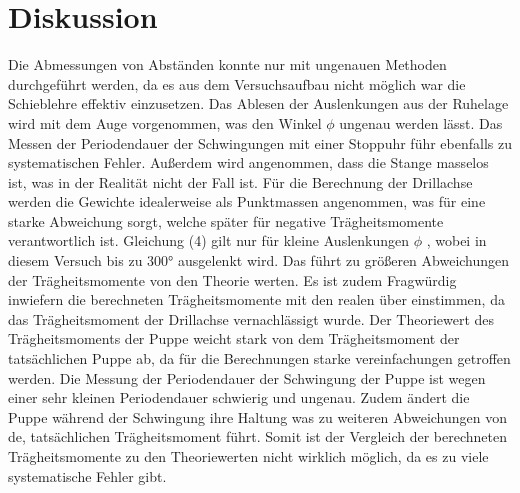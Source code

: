 \section{Diskussion}
\label{sec:Diskussion}
Die Abmessungen von Abständen konnte nur mit ungenauen Methoden durchgeführt werden,
da es aus dem Versuchsaufbau nicht möglich war die Schieblehre effektiv einzusetzen.
Das Ablesen der Auslenkungen aus der Ruhelage wird mit dem Auge vorgenommen, was
den Winkel $\phi$ ungenau werden lässt. Das Messen der Periodendauer der
Schwingungen mit einer Stoppuhr führ ebenfalls zu systematischen Fehler.
Außerdem wird angenommen, dass die Stange masselos ist, was in der Realität
nicht der Fall ist. Für die Berechnung der Drillachse werden die Gewichte idealerweise
als Punktmassen angenommen, was für eine starke Abweichung sorgt, welche später für
negative Trägheitsmomente verantwortlich ist.
Gleichung (4) gilt nur für kleine Auslenkungen $\phi$ , wobei
in diesem Versuch bis zu 300° ausgelenkt wird. Das führt zu größeren Abweichungen
der Trägheitsmomente von den Theorie werten. Es ist zudem Fragwürdig inwiefern die
berechneten Trägheitsmomente mit den realen über einstimmen, da das Trägheitsmoment
der Drillachse vernachlässigt wurde.
Der Theoriewert des Trägheitsmoments
der Puppe weicht stark von dem Trägheitsmoment der tatsächlichen Puppe ab, da für die
Berechnungen starke vereinfachungen getroffen werden. Die Messung der Periodendauer
der Schwingung der Puppe ist wegen einer sehr kleinen Periodendauer schwierig und
ungenau. Zudem ändert die Puppe während der Schwingung ihre Haltung was zu
weiteren Abweichungen von de, tatsächlichen Trägheitsmoment führt. Somit ist der
Vergleich der berechneten Trägheitsmomente zu den Theoriewerten nicht wirklich
möglich, da es zu viele systematische Fehler gibt.
